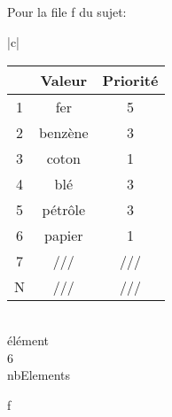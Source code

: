 \documentclass{article}
\begin{document}
		\subsection{}
		Pour la file f du sujet:\\
		\begin{tabular}{|c|}
		\hline
		\\
		\begin{tabular}{|c|c|c|}
			\hline
				& \textbf{Valeur} & \textbf{Priorité}\\
			\hline
				1 & fer & 5\\
			\hline
				2 & benzène & 3\\
			\hline
				3 & coton & 1\\
			\hline
				4 & blé & 3\\
			\hline
				5 & pétrôle & 3\\
			\hline
				6 & papier & 1\\
			\hline
				7 & /// & ///\\
				N & /// & ///\\
			\hline
		\end{tabular}
		\\
			élément\\ 
			6\\
			nbElements\\
			\hline
		\end{tabular}
		f
		\\	
			
		\subsection{}
			
\end{document}
